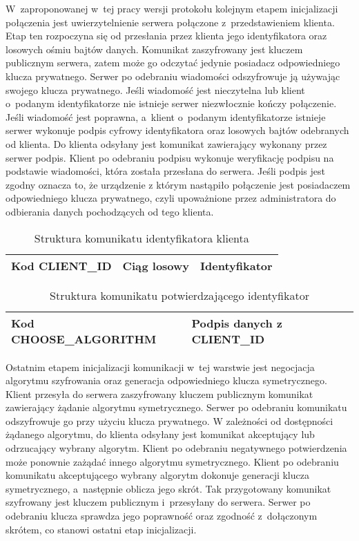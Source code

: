 W~zaproponowanej w~tej pracy wersji protokołu kolejnym etapem
inicjalizacji połączenia jest uwierzytelnienie serwera połączone
z~przedstawieniem klienta. Etap ten rozpoczyna się od przesłania przez
klienta jego identyfikatora oraz losowych ośmiu bajtów
danych. Komunikat zaszyfrowany jest kluczem publicznym serwera, zatem
może go odczytać jedynie posiadacz odpowiedniego klucza
prywatnego. Serwer po odebraniu wiadomości odszyfrowuje ją używając
swojego klucza prywatnego. Jeśli wiadomość jest nieczytelna lub klient
o~podanym identyfikatorze nie istnieje serwer niezwłocznie kończy
połączenie. Jeśli wiadomość jest poprawna, a~klient o~podanym
identyfikatorze istnieje serwer wykonuje podpis cyfrowy identyfikatora
oraz losowych bajtów odebranych od klienta. Do klienta odsyłany jest
komunikat zawierający wykonany przez serwer podpis. Klient po
odebraniu podpisu wykonuje weryfikację podpisu na podstawie
wiadomości, która została przesłana do serwera. Jeśli podpis jest
zgodny oznacza to, że urządzenie z którym nastąpiło połączenie jest
posiadaczem odpowiedniego klucza prywatnego, czyli upoważnione przez
administratora do odbierania danych pochodzących od tego klienta.

\begin{table}[H]
\centering
\caption{Struktura komunikatu identyfikatora klienta }

\begin{tabular}{|p{3cm}|p{3cm}|p{6cm}|}
\hline
Kod CLIENT\_ID & Ciąg losowy & Identyfikator\\
\hline
\end{tabular}
\end{table}

\begin{table}[H]
\centering
\caption{Struktura komunikatu potwierdzającego identyfikator }

\begin{tabular}{|p{6cm}|p{6cm}|}
\hline
Kod CHOOSE\_ALGORITHM & Podpis danych z CLIENT\_ID\\
\hline
\end{tabular}
\end{table}

Ostatnim etapem inicjalizacji komunikacji w~tej warstwie jest
negocjacja algorytmu szyfrowania oraz generacja odpowiedniego klucza
symetrycznego. Klient przesyła do serwera zaszyfrowany kluczem
publicznym komunikat zawierający żądanie algorytmu
symetrycznego. Serwer po odebraniu komunikatu odszyfrowuje go przy
użyciu klucza prywatnego. W zależności od dostępności żądanego
algorytmu, do klienta odsyłany jest komunikat akceptujący lub
odrzucający wybrany algorytm. Klient po odebraniu negatywnego
potwierdzenia może ponownie zażądać innego algorytmu
symetrycznego. Klient po odebraniu komunikatu akceptującego wybrany
algorytm dokonuje generacji klucza symetrycznego, a~następnie oblicza
jego skrót. Tak przygotowany komunikat szyfrowany jest kluczem
publicznym i~przesyłany do serwera. Serwer po odebraniu klucza
sprawdza jego poprawność oraz zgodność z~dołączonym skrótem, co
stanowi ostatni etap inicjalizacji.

